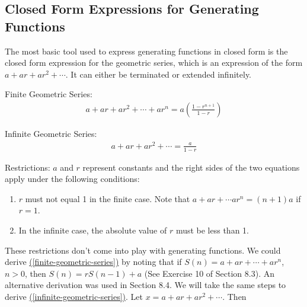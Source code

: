 \documentclass[10pt,]{book}
\theoremstyle{plain}
\theoremstyle{definition}
\theoremstyle{definition}
\theoremstyle{definition}
\theoremstyle{definition}
\numberwithin{equation}{section}
\begin{document}
\subsection[Closed Form Expressions for Generating Functions]{Closed Form Expressions for Generating Functions}\label{ss-closed-form-expressions-for-generating-functions}
The most basic tool used to express generating functions in closed form is the closed form expression for the geometric series, which is an expression
of the form \(a + a r + a r^2+ \cdots\). It can either be terminated or extended infinitely.%
\par
Finite Geometric Series: 
\begin{gather}
a + a r + a r^2+ \cdots +a r^n= a\left(\frac{1-r^{n+1}}{1-r}\right)
\label{finite-geometric-series}
\end{gather} %
\par
Infinite Geometric Series:
\begin{gather}
a + a r + a r^2+ \cdots = \frac{a}{1-r}
\label{infinite-geometric-series}
\end{gather} %
\par
Restrictions: 
\(a\) and \(r\) represent constants and the right sides of the two equations apply under the following conditions:%
\par
\leavevmode%
\begin{enumerate}[label=\arabic*]
\item\hypertarget{li-146}{}\(r\) must not equal 1 in the finite case. Note that \(a + a r + \cdots  a r^n = (n + 1)a\) if\(r = 1\).%
\item\hypertarget{li-147}{} In the infinite case, the absolute value of \(r\) must be less than 1.%
\end{enumerate}
%
\par
These restrictions don't come into play with generating functions. We could derive \hyperref[finite-geometric-series]{(\ref{finite-geometric-series})} by noting that if \(S(n) = a + a r +\cdots  + a r^n\), \(n
> 0\), then \(S(n) = r S(n - 1) + a\) (See Exercise 10 of Section 8.3). An alternative derivation was used in Section 8.4. We will take the same
steps to derive \hyperref[infinite-geometric-series]{(\ref{infinite-geometric-series})}. Let \(x = a + a r + a r^2 + \cdots \).  Then
\end{document}
